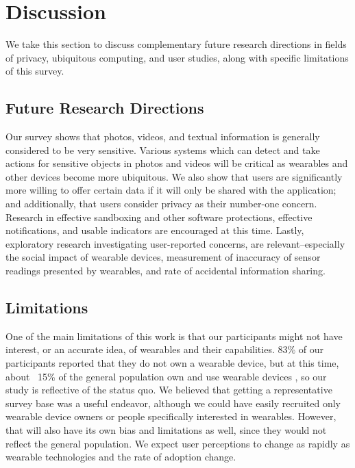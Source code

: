 \documentclass{acm_proc_article-sp}
\begin{document}

\section{Discussion}
We take this section to discuss complementary future research directions in fields of privacy, ubiquitous computing, and user studies, along with specific limitations of this survey. 

\subsection{Future Research Directions}

Our survey shows that photos, videos, and textual information is generally considered to be very sensitive. Various systems which can detect and take actions for sensitive objects in photos and videos will be critical as wearables and other devices become more ubiquitous. We also show that users are significantly more willing to offer certain data if it will only be shared with the application; and additionally, that users consider privacy as their number-one concern. Research in effective sandboxing and other software protections, effective notifications, and usable indicators are encouraged at this time. Lastly, exploratory research investigating user-reported concerns, are relevant--especially the social impact of wearable devices, measurement of inaccuracy of sensor readings presented by wearables, and rate of accidental information sharing. 

\subsection{Limitations}
One of the main limitations of this work is that our participants might not have interest, or an accurate idea, of wearables and their capabilities. 83\% of our participants reported that they do not own a wearable device, but at this time, about ~15\% of the general population own and use wearable devices \cite{Nilsen,WearableStatNews}, so our study is reflective of the status quo. We believed that getting a representative survey base was a useful endeavor, although we could have easily recruited only wearable device owners or people specifically interested in wearables. However, that will also have its own bias and limitations as well, since they would not reflect the general population. We expect user perceptions to change as rapidly as wearable technologies and the rate of adoption change. 
\end{document}
